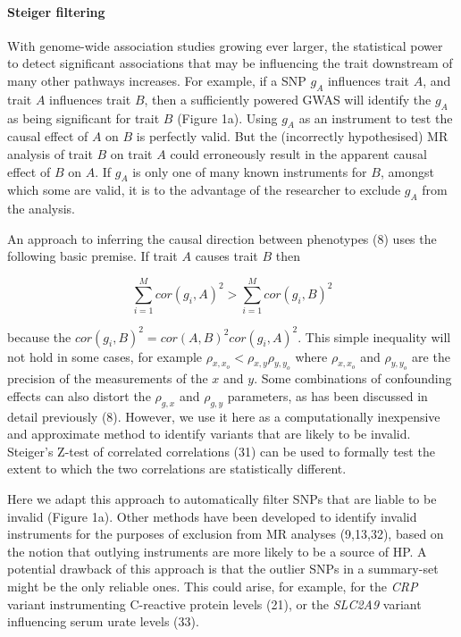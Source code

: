 \documentclass[]{article}
\let\oldparagraph\paragraph
\renewcommand{\paragraph}[1]{\oldparagraph{#1}\mbox{}}
\begin{document}
\paragraph{Steiger filtering}\label{steiger-filtering}

With genome-wide association studies growing ever larger, the
statistical power to detect significant associations that may be
influencing the trait downstream of many other pathways increases. For
example, if a SNP \(g_{A}\) influences trait \(A\), and trait \(A\)
influences trait \(B\), then a sufficiently powered GWAS will identify
the \(g_{A}\) as being significant for trait \(B\) (Figure 1a). Using
\(g_{A}\) as an instrument to test the causal effect of \(A\) on \(B\)
is perfectly valid. But the (incorrectly hypothesised) MR analysis of
trait \(B\) on trait \(A\) could erroneously result in the apparent
causal effect of \(B\) on \(A\). If \(g_{A}\) is only one of many known
instruments for \(B\), amongst which some are valid, it is to the
advantage of the researcher to exclude \(g_{A}\) from the analysis.

An approach to inferring the causal direction between phenotypes (8)
uses the following basic premise. If trait \(A\) causes trait \(B\) then

\[
\sum^M_{i=1}{cor(g_{i}, A)^2} > \sum^M_{i=1}{cor(g_{i}, B)^2}
\]

because the \(cor(g_{i}, B)^2 = cor(A, B)^{2} cor(g_{i}, A)^{2}\). This
simple inequality will not hold in some cases, for example
\(\rho_{x, x_o} < \rho_{x,y}\rho_{y,y_o}\) where \(\rho_{x, x_o}\) and
\(\rho_{y, y_o}\) are the precision of the measurements of the \(x\) and
\(y\). Some combinations of confounding effects can also distort the
\(\rho_{g,x}\) and \(\rho_{g,y}\) parameters, as has been discussed in
detail previously (8). However, we use it here as a computationally
inexpensive and approximate method to identify variants that are likely
to be invalid. Steiger's Z-test of correlated correlations (31) can be
used to formally test the extent to which the two correlations are
statistically different.

Here we adapt this approach to automatically filter SNPs that are liable
to be invalid (Figure 1a). Other methods have been developed to identify
invalid instruments for the purposes of exclusion from MR analyses
(9,13,32), based on the notion that outlying instruments are more likely
to be a source of HP. A potential drawback of this approach is that the
outlier SNPs in a summary-set might be the only reliable ones. This
could arise, for example, for the \emph{CRP} variant instrumenting
C-reactive protein levels (21), or the \emph{SLC2A9} variant influencing
serum urate levels (33).
\end{document}
